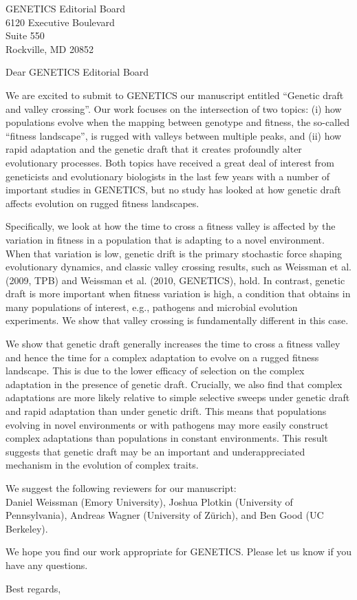 \documentclass[kentucky,10pt,foldmarks=off,backaddress=false,refline=dateleft,letterpaper]{scrlttr2}
\begin{document}
\begin{letter}{
    GENETICS Editorial Board\\
    6120 Executive Boulevard\\
    Suite 550\\
    Rockville, MD 20852}

\opening{Dear GENETICS Editorial Board}


We are excited to submit to GENETICS our manuscript entitled ``Genetic draft and valley crossing''.
Our work focuses on the intersection of two topics:
(i) how populations evolve when the mapping between genotype and fitness, the so-called ``fitness landscape'', is rugged with valleys between multiple peaks, and
(ii) how rapid adaptation and the genetic draft that it creates profoundly alter evolutionary processes.
Both topics have received a great deal of interest from geneticists and evolutionary biologists in the last few years with a number of important studies in GENETICS, but no study has looked at how genetic draft affects evolution on rugged fitness landscapes.

Specifically, we look at how the time to cross a fitness valley is affected by the variation in fitness in a population that is adapting to a novel environment.
When that variation is low, genetic drift is the primary stochastic force shaping evolutionary dynamics, and classic valley crossing results, such as Weissman et al. (2009, TPB) and Weissman et al. (2010, GENETICS), hold.
In contrast, genetic draft is more important when fitness variation is high, a condition that obtains in many populations of interest, e.g., pathogens and microbial evolution experiments.
We show that valley crossing is fundamentally different in this case.

We show that genetic draft generally increases the time to cross a fitness valley and hence the time for a complex adaptation to evolve on a rugged fitness landscape.
This is due to the lower efficacy of selection on the complex adaptation in the presence of genetic draft.
Crucially, we also find that complex adaptations are more likely relative to simple selective sweeps under genetic draft and rapid adaptation than under genetic drift.
This means that populations evolving in novel environments or with pathogens may more easily construct complex adaptations than populations in constant environments.
This result suggests that genetic draft may be an important and underappreciated mechanism in the evolution of complex traits.

We suggest the following reviewers for our manuscript:\\
Daniel Weissman (Emory University), Joshua Plotkin (University of Pennsylvania), Andreas Wagner (University of Zürich), and Ben Good (UC Berkeley).

We hope you find our work appropriate for GENETICS.
Please let us know if you have any questions.

\closing{Best regards,}

\end{letter}
\end{document}
